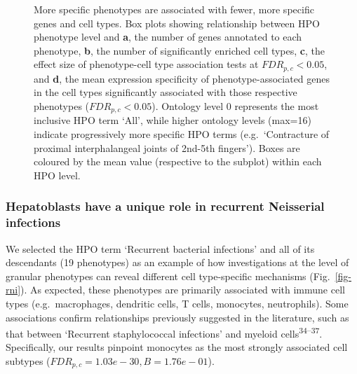 \documentclass[
sn-nature
]{sn-jnl}
\begin{document}
\label{cell-fig-ontology-lvl}
\begin{figure}[H]


\caption{\label{fig-ontology-lvl}More specific phenotypes are associated
with fewer, more specific genes and cell types. Box plots showing
relationship between HPO phenotype level and \textbf{a}, the number of
genes annotated to each phenotype, \textbf{b}, the number of
significantly enriched cell types, \textbf{c}, the effect size of
phenotype-cell type association tests at \(FDR_{p,c}<0.05\), and
\textbf{d}, the mean expression specificity of phenotype-associated
genes in the cell types significantly associated with those respective
phenotypes (\(FDR_{p,c}<0.05\)). Ontology level 0 represents the most
inclusive HPO term `All', while higher ontology levels (max=16) indicate
progressively more specific HPO terms (e.g.~`Contracture of proximal
interphalangeal joints of 2nd-5th fingers'). Boxes are coloured by the
mean value (respective to the subplot) within each HPO level.}

\end{figure}%

\subsubsection{Hepatoblasts have a unique role in recurrent Neisserial
infections}\label{hepatoblasts-have-a-unique-role-in-recurrent-neisserial-infections}

We selected the HPO term `Recurrent bacterial infections' and all of its
descendants (19 phenotypes) as an example of how investigations at the
level of granular phenotypes can reveal different cell type-specific
mechanisms (Fig.~\ref{fig-rni}). As expected, these phenotypes are
primarily associated with immune cell types (e.g.~macrophages, dendritic
cells, T cells, monocytes, neutrophils). Some associations confirm
relationships previously suggested in the literature, such as that
between `Recurrent staphylococcal infections' and myeloid
cells\textsuperscript{34--37}. Specifically, our results pinpoint
monocytes as the most strongly associated cell subtypes
(\(FDR_{p,c}= 1.03e-30,B= 1.76e-01\)).
\end{document}
